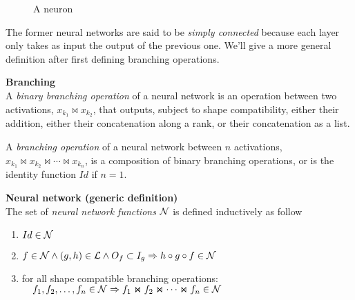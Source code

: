 \begin{figure}[H]
\centering
{}
\caption{A neuron}
\label{fig:neuron}
\end{figure}

The former neural networks are said to be \emph{simply connected} because each layer only takes as input the output of the previous one. We'll give a more general definition after first defining branching operations.

\begin{definition}\textbf{Branching}\\
A \emph{binary branching operation} of a neural network is an operation between two activations, $x_{k_1} \Join x_{k_2}$, that outputs, subject to shape compatibility, either their addition, either their concatenation along a rank, or their concatenation as a list.

A \emph{branching operation} of a neural network between $n$ activations, $x_{k_1} \Join x_{k_2} \Join \cdots \Join x_{k_n}$, is a composition of binary branching operations, or is the identity function $Id$ if $n = 1$.
\end{definition}

\begin{definition}\textbf{Neural network (generic definition)}\\
The set of \emph{neural network functions} $\mathcal{N}$ is defined inductively as follow
\begin{enumerate}
  \item $Id \in \mathcal{N}$
  \item $f \in \mathcal{N} \wedge (g,h) \in \mathcal{L} \wedge O_f \subset I_g \Rightarrow h \circ g \circ f \in \mathcal{N}$
  \item for all shape compatible branching operations:\\
  $\quad f_1, f_2, \ldots, f_n \in \mathcal{N} \Rightarrow  f_1 \Join f_2 \Join \cdots \Join f_n \in \mathcal{N}$
\end{enumerate}
\label{def:nn2}
\end{definition}

